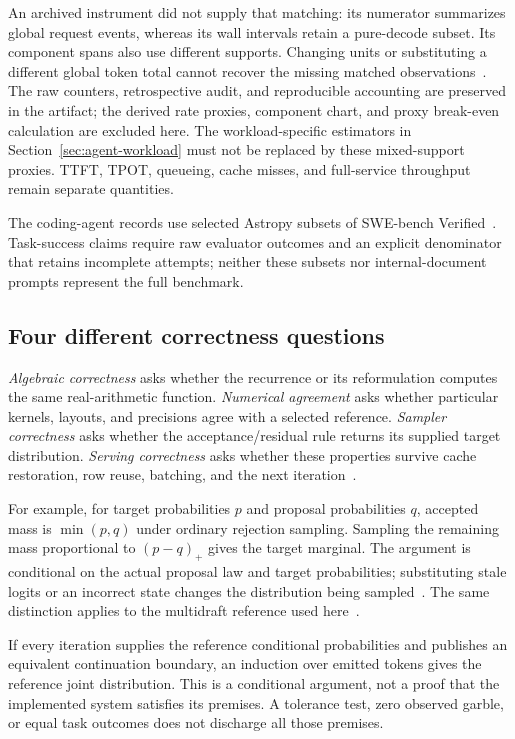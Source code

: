 \documentclass[conference]{IEEEtran}
\begin{document}
An archived instrument did not supply that matching: its numerator summarizes global request events, whereas its wall intervals retain a pure-decode subset. Its component spans also use different supports. Changing units or substituting a different global token total cannot recover the missing matched observations~\cite{lumo2026archive}. The raw counters, retrospective audit, and reproducible accounting are preserved in the artifact; the derived rate proxies, component chart, and proxy break-even calculation are excluded here. The workload-specific estimators in Section~\ref{sec:agent-workload} must not be replaced by these mixed-support proxies. TTFT, TPOT, queueing, cache misses, and full-service throughput remain separate quantities.


The coding-agent records use selected Astropy subsets of SWE-bench Verified~\cite{jimenez2024swe}. Task-success claims require raw evaluator outcomes and an explicit denominator that retains incomplete attempts; neither these subsets nor internal-document prompts represent the full benchmark.

\subsection{Four different correctness questions}
\textit{Algebraic correctness} asks whether the recurrence or its reformulation computes the same real-arithmetic function. \textit{Numerical agreement} asks whether particular kernels, layouts, and precisions agree with a selected reference. \textit{Sampler correctness} asks whether the acceptance/residual rule returns its supplied target distribution. \textit{Serving correctness} asks whether these properties survive cache restoration, row reuse, batching, and the next iteration~\cite{yang2024delta,chen2023sampling,lumo2026archive}.

For example, for target probabilities $p$ and proposal probabilities $q$, accepted mass is $\min(p,q)$ under ordinary rejection sampling. Sampling the remaining mass proportional to $(p-q)_+$ gives the target marginal. The argument is conditional on the actual proposal law and target probabilities; substituting stale logits or an incorrect state changes the distribution being sampled~\cite{leviathan2023fast,chen2023sampling}. The same distinction applies to the multidraft reference used here~\cite{miao2023specinfer,lumo2026archive}.

If every iteration supplies the reference conditional probabilities and publishes an equivalent continuation boundary, an induction over emitted tokens gives the reference joint distribution. This is a conditional argument, not a proof that the implemented system satisfies its premises. A tolerance test, zero observed garble, or equal task outcomes does not discharge all those premises.
\end{document}
